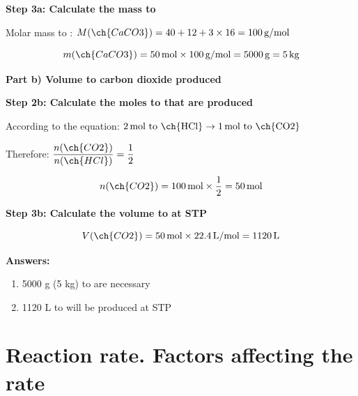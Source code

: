 \begin{exercise}
\begin{solu}
        \textbf{Step 3a: Calculate the mass to }

        Molar mass to : $M(\ch{CaCO3}) = 40 + 12 + 3 \times 16 = 100\,\text{g/mol}$

        \begin{equation*}
            m(\ch{CaCO3}) = 50\,\text{mol} \times 100\,\text{g/mol} = 5000\,\text{g} = 5\,\text{kg}
        \end{equation*}

        \textbf{Part b) Volume to carbon dioxide produced}

        \textbf{Step 2b: Calculate the moles to  that are produced}

        According to the equation: $2\,\text{mol to \ch{HCl}} \rightarrow 1\,\text{mol to \ch{CO2}}$

        Therefore: $\dfrac{n(\ch{CO2})}{n(\ch{HCl})} = \dfrac{1}{2}$

        \begin{equation*}
            n(\ch{CO2}) = 100\,\text{mol} \times \frac{1}{2} = 50\,\text{mol}
        \end{equation*}

        \textbf{Step 3b: Calculate the volume to  at STP}

        \begin{equation*}
            V(\ch{CO2}) = 50\,\text{mol} \times 22.4\,\text{L/mol} = 1120\,\text{L}
        \end{equation*}

        \textbf{Answers:}
        \begin{enumerate}[label=\letraminuscula]
            \item 5000 g (5 kg) to  are necessary
            \item 1120 L to  will be produced at STP
        \end{enumerate}
    \end{solu}
\end{exercise}

\section{Reaction rate. Factors affecting the rate}

